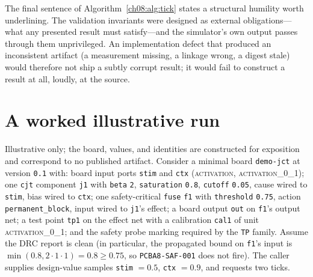 The final sentence of Algorithm~\ref{ch08:alg:tick} states a structural humility worth underlining. The validation invariants were designed as external obligations---what any presented result must satisfy---and the simulator's own output passes through them unprivileged. An implementation defect that produced an inconsistent artifact (a measurement missing, a linkage wrong, a digest stale) would therefore not ship a subtly corrupt result; it would fail to construct a result at all, loudly, at the source.

\section{A worked illustrative run}\label{ch08:sec:worked}

\begin{example}\label{ch08:ex:worked}
Illustrative only; the board, values, and identities are constructed for exposition and correspond to no published artifact. Consider a minimal board \texttt{demo-jct} at version \texttt{0.1} with: board input ports \texttt{stim} and \texttt{ctx} (\textsc{activation}, \textsc{activation\_0\_1}); one \texttt{cjt} component \texttt{j1} with \texttt{beta} \texttt{2}, \texttt{saturation} \texttt{0.8}, \texttt{cutoff} \texttt{0.05}, cause wired to \texttt{stim}, bias wired to \texttt{ctx}; one safety-critical \texttt{fuse} \texttt{f1} with \texttt{threshold} \texttt{0.75}, action \texttt{permanent\_block}, input wired to \texttt{j1}'s effect; a board output \texttt{out} on \texttt{f1}'s output net; a test point \texttt{tp1} on the effect net with a calibration \texttt{cal1} of unit \textsc{activation\_0\_1}; and the safety probe marking required by the \texttt{TP} family. Assume the DRC report is clean (in particular, the propagated bound on \texttt{f1}'s input is $\min(0.8, 2 \cdot 1 \cdot 1) = 0.8 \geq 0.75$, so \texttt{PCBA8-SAF-001} does not fire). The caller supplies design-value samples \texttt{stim} $= 0.5$, \texttt{ctx} $= 0.9$, and requests two ticks.


\end{example}

